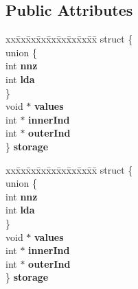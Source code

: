 \subsection*{Public Attributes}
\begin{DoxyCompactItemize}
\item 
\mbox{\label{struct_eigen_1_1_slu_matrix_a50ac7e592b78ceffda1daf52d98970ce}} 
\begin{tabbing}
xx\=xx\=xx\=xx\=xx\=xx\=xx\=xx\=xx\=\kill
struct \{\\
\mbox{\label{struct_eigen_1_1_slu_matrix_1_1_0D650_a2cc397feef1b6543b74434938e375b75}} 
\>union \{\\
\>\>int {\bfseries nnz}\\
\>\>int {\bfseries lda}\\
\>\} \\
\>void $\ast$ {\bfseries values}\\
\>int $\ast$ {\bfseries innerInd}\\
\>int $\ast$ {\bfseries outerInd}\\
\} {\bfseries storage}\\

\end{tabbing}\item 
\mbox{\label{struct_eigen_1_1_slu_matrix_a07d23c84ae760c58afaade2282bba58c}} 
\begin{tabbing}
xx\=xx\=xx\=xx\=xx\=xx\=xx\=xx\=xx\=\kill
struct \{\\
\mbox{\label{struct_eigen_1_1_slu_matrix_1_1_0D1539_a394aafde474cff511c334ee749126970}} 
\>union \{\\
\>\>int {\bfseries nnz}\\
\>\>int {\bfseries lda}\\
\>\} \\
\>void $\ast$ {\bfseries values}\\
\>int $\ast$ {\bfseries innerInd}\\
\>int $\ast$ {\bfseries outerInd}\\
\} {\bfseries storage}\\

\end{tabbing}\end{DoxyCompactItemize}


